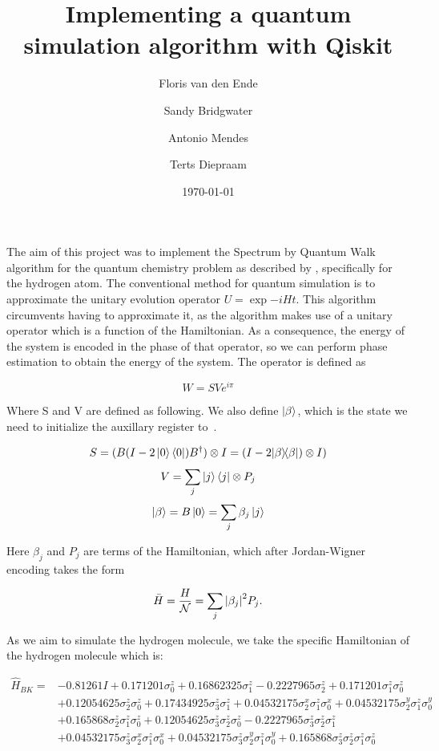 \documentclass{article}
\title{Implementing a quantum simulation algorithm with Qiskit}
\author{Floris van den Ende\and Sandy Bridgwater\and Antonio Mendes\and Terts Diepraam}
\date{\today}
\def\kb#1#2{| #1 \rangle\!\langle #2 |}
\begin{document}
\maketitle

The aim of this project was to implement the Spectrum by Quantum Walk algorithm for the quantum chemistry problem as described by \textcite{poulin}, specifically for the hydrogen atom. The conventional method for quantum simulation is to approximate the unitary evolution operator $U = \exp{-iHt}$. This algorithm circumvents having to approximate it, as the algorithm makes use of a unitary operator which is a function of the Hamiltonian. As a consequence, the energy of the system is encoded in the phase of that operator, so we can perform phase estimation to obtain the energy of the system. The operator is defined as

\begin{equation} \label{W}
W = SV e^{i\pi}
\end{equation}

Where S and V are defined as following. We also define $\ket{\beta}$, which is the state we need to initialize the auxillary register to~\cite{poulin}.

\[ S = (B (I - 2 \ket{0}\bra{0}) B^{\dagger}) \otimes I= (I-2\kb \beta \beta) \otimes I) \]
\[ V=\sum_{j}\ket{j}\bra{j} \otimes P_{j} \]
\[ \ket{\beta} = B \ket{0} = \sum_j \beta_j \ket{j} \]

Here $\beta_j$ and $P_j$ are terms of the Hamiltonian, which after Jordan-Wigner encoding takes the form

\begin{equation}
	\bar H = \frac H{\mathcal{N}} = \sum_j\abs{\beta_j}^2 P_j.
\end{equation}

As we aim to simulate the hydrogen molecule, we take the specific Hamiltonian of the hydrogen molecule which is:

\begin{align*}
\hat{H}_{B K}=&-0.81261 I+0.171201 \sigma_{0}^{z}+0.16862325 \sigma_{1}^{z}-0.2227965 \sigma_{2}^{z}+0.171201 \sigma_{1}^{z} \sigma_{0}^{z} \\
&+0.12054625 \sigma_{2}^{z} \sigma_{0}^{z}+0.17434925 \sigma_{3}^{z} \sigma_{1}^{z}+0.04532175 \sigma_{2}^{x} \sigma_{1}^{z} \sigma_{0}^{x}+0.04532175 \sigma_{2}^{y} \sigma_{1}^{z} \sigma_{0}^{y} \\
&+0.165868 \sigma_{2}^{z} \sigma_{1}^{z} \sigma_{0}^{z}+0.12054625 \sigma_{3}^{z} \sigma_{2}^{z} \sigma_{0}^{z}-0.2227965 \sigma_{3}^{z} \sigma_{2}^{z} \sigma_{1}^{z} \\
&+0.04532175 \sigma_{3}^{z} \sigma_{2}^{x} \sigma_{1}^{z} \sigma_{0}^{x}+0.04532175 \sigma_{3}^{z} \sigma_{2}^{y} \sigma_{1}^{z} \sigma_{0}^{y}+0.165868 \sigma_{3}^{z} \sigma_{2}^{z} \sigma_{1}^{z} \sigma_{0}^{z}
\end{align*}
\end{document}
